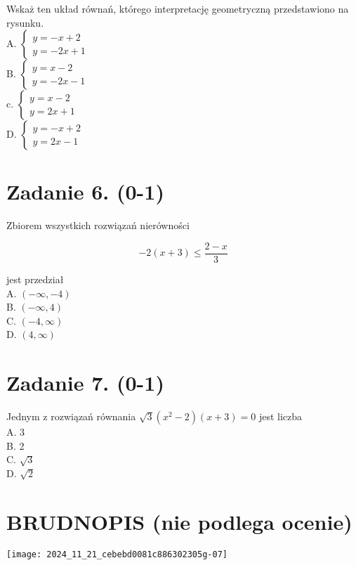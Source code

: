 \documentclass[10pt]{article}
\begin{document}
Wskaż ten układ równań, którego interpretację geometryczną przedstawiono na rysunku.\\
A. \(\left\{\begin{array}{l}y=-x+2 \\ y=-2 x+1\end{array}\right.\)\\
B. \(\left\{\begin{array}{l}y=x-2 \\ y=-2 x-1\end{array}\right.\)\\
c. \(\left\{\begin{array}{l}y=x-2 \\ y=2 x+1\end{array}\right.\)\\
D. \(\left\{\begin{array}{l}y=-x+2 \\ y=2 x-1\end{array}\right.\)

\section*{Zadanie 6. (0-1)}
Zbiorem wszystkich rozwiązań nierówności

\[
-2(x+3) \leq \frac{2-x}{3}
\]

jest przedział\\
A. \((-\infty,-4)\)\\
B. \((-\infty, 4)\)\\
C. \((-4, \infty)\)\\
D. \((4, \infty)\)

\section*{Zadanie 7. (0-1)}
Jednym z rozwiązań równania \(\sqrt{3}\left(x^{2}-2\right)(x+3)=0\) jest liczba\\
A. 3\\
B. 2\\
C. \(\sqrt{3}\)\\
D. \(\sqrt{2}\)

\section*{BRUDNOPIS (nie podlega ocenie)}
\begin{center}
\texttt{[image: 2024\_11\_21\_cebebd0081c886302305g-07]}
\end{center}
\end{document}
